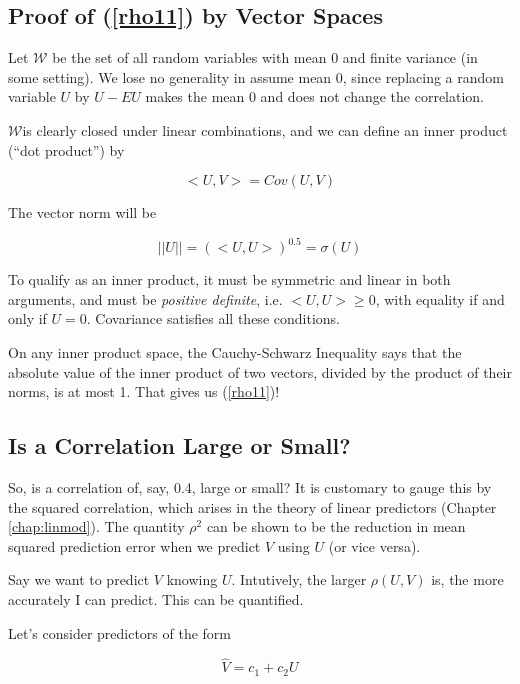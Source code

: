 \subsection{Proof of (\ref{rho11}) by Vector Spaces}

Let $\mathcal{W}$ be the set of all random variables with mean 0 and
finite
variance (in some setting).  We lose no generality in assume mean 0,
since replacing a random variable $U$ by $U - EU$ makes the mean 0 and
does not change the correlation.

$\mathcal{W}$is clearly closed under linear combinations, and we can
define an inner product (``dot product'') by

\begin{equation}
<U,V> = Cov(U,V)
\end{equation}

The vector norm will be

\begin{equation}
||U|| = (<U,U>)^{0.5} = \sigma(U)
\end{equation}

To qualify as an inner product, it must be symmetric and linear in both
arguments, and must be \textit{positive definite}, i.e. $<U,U> \geq 0$,
with equality if and only if $U = 0$.  Covariance satisfies all these
conditions. 

On any inner product space, the Cauchy-Schwarz Inequality says that the
absolute value of the inner product of two vectors, divided by the
product of their norms, is at most 1.  That gives us (\ref{rho11})!

\subsection{Is a Correlation Large or Small?}
\label{rholargesmall}

So, is a correlation of, say, 0.4, large or small?  It is customary to
gauge this by the squared correlation, which arises in the theory of
linear predictors (Chapter \ref{chap:linmod}).  The quantity $\rho^2$ can be
shown to be the reduction in mean squared prediction error when we
predict $V$ using $U$ (or vice versa).

Say we want to predict $V$ knowing $U$.  Intutively, the larger
$\rho(U,V)$ is, the more accurately I can predict.  This can be quantified.

Let's consider predictors of the form

\begin{equation}
\label{predv}
\widehat{V} = c_1 + c_2 U
\end{equation}

